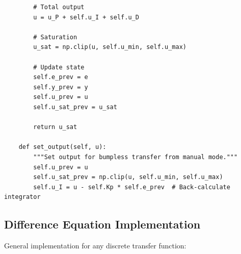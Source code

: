 \begin{verbatim}
        # Total output
        u = u_P + self.u_I + self.u_D

        # Saturation
        u_sat = np.clip(u, self.u_min, self.u_max)

        # Update state
        self.e_prev = e
        self.y_prev = y
        self.u_prev = u
        self.u_sat_prev = u_sat

        return u_sat

    def set_output(self, u):
        """Set output for bumpless transfer from manual mode."""
        self.u_prev = u
        self.u_sat_prev = np.clip(u, self.u_min, self.u_max)
        self.u_I = u - self.Kp * self.e_prev  # Back-calculate integrator
\end{verbatim}

\subsection{Difference Equation Implementation}

General implementation for any discrete transfer function:


